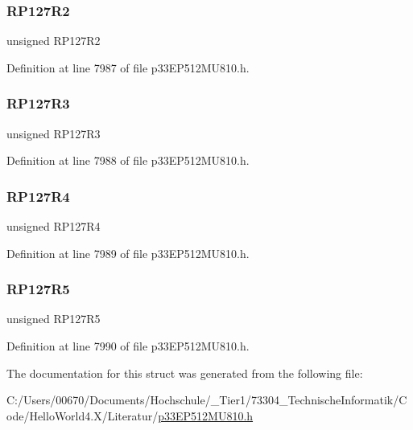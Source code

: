 \subsubsection{\texorpdfstring{R\+P127\+R2}{RP127R2}}
{\footnotesize\ttfamily unsigned R\+P127\+R2}



Definition at line 7987 of file p33\+E\+P512\+M\+U810.\+h.

\mbox{\label{structtag_r_p_o_r15_b_i_t_s_a7a213d942d454b5212f1b101a6462175}} 
\subsubsection{\texorpdfstring{R\+P127\+R3}{RP127R3}}
{\footnotesize\ttfamily unsigned R\+P127\+R3}



Definition at line 7988 of file p33\+E\+P512\+M\+U810.\+h.

\mbox{\label{structtag_r_p_o_r15_b_i_t_s_ac27a8a2d2b38867de9975fe91d200bdd}} 
\subsubsection{\texorpdfstring{R\+P127\+R4}{RP127R4}}
{\footnotesize\ttfamily unsigned R\+P127\+R4}



Definition at line 7989 of file p33\+E\+P512\+M\+U810.\+h.

\mbox{\label{structtag_r_p_o_r15_b_i_t_s_a2c8700d9a8720d42270043791f8dc97b}} 
\subsubsection{\texorpdfstring{R\+P127\+R5}{RP127R5}}
{\footnotesize\ttfamily unsigned R\+P127\+R5}



Definition at line 7990 of file p33\+E\+P512\+M\+U810.\+h.



The documentation for this struct was generated from the following file\+:\begin{DoxyCompactItemize}
\item 
C\+:/\+Users/00670/\+Documents/\+Hochschule/\+\_\+\+Tier1/73304\+\_\+\+Technische\+Informatik/\+Code/\+Hello\+World4.\+X/\+Literatur/\hyperlink{p33_e_p512_m_u810_8h}{p33\+E\+P512\+M\+U810.\+h}\end{DoxyCompactItemize}
